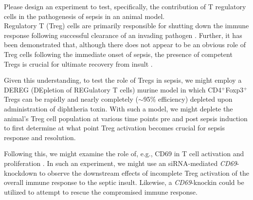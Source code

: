 \documentclass[11pt,letterpaper,final] {article}
\newenvironment{exercise}[2][Exercise]{\begin{trivlist}
	\item[\hskip \labelsep {\bfseries #1}\hskip \labelsep {\bfseries #2.}]}{\end{trivlist}}
\begin{document}
\begin{exercise}[Exercise]{5} Please design an experiment to test, specifically, the contribution of T regulatory cells in the pathogenesis of sepsis in an animal model.\\

Regulatory T (Treg) cells are primarily responsible for shutting down the immune response following successful clearance of an invading pathogen \cite{Shevach:2000}. Further, it has been demonstrated that, although there does not appear to be an obvious role of Treg cells following the immediate onset of sepsis, the presence of competent Tregs is crucial for ultimate recovery from insult \cite{Kuhlhorn:2013}.

Given this understanding, to test the role of Tregs in sepsis, we might employ a DEREG (DEpletion of REGulatory T cells) murine model in which CD4$^{+}$Foxp3$^{+}$ Tregs can be rapidly and nearly completely ($\sim$95\% efficiency) depleted upon administration of diphtheria toxin. With such a model, we might deplete the animal's Treg cell population at various time points pre and post sepsis induction to first determine at what point Treg activation becomes crucial for sepsis response and resolution.

Following this, we might examine the role of, e.g., CD69 in T cell activation and proliferation \cite{Schmoeckel:2014}. In such an experiment, we might use an siRNA-mediated \textit{CD69}-knockdown to observe the downstream effects of incomplete Treg activation of the overall immune response to the septic insult. Likewise, a \textit{CD69}-knockin could be utilized to attempt to rescue the compromised immune response.

\end{exercise}


\clearpage


\end{document}
